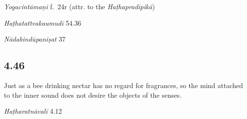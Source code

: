 \begin{ekdosis}

\begin{testimonia}[hp04_045]
\emph{Yogacintāmaṇi} f.~24r (attr. to the \emph{Haṭhapradīpikā})
\begin{versinnote}
\end{versinnote}

\emph{Haṭhatattvakaumudī} 54.36
\begin{versinnote}
\end{versinnote}

\emph{Nādabindūpaniṣat} 37
\begin{versinnote}
\end{versinnote}
\end{testimonia}


\subsection*{4.46}
\begin{translation}[hp04_046]
Just as a bee drinking nectar has no regard for fragrances, so the mind attached to the inner sound does not desire the objects of the senses.
\end{translation}


\begin{testimonia}[hp04_046]
\emph{Haṭharatnāvalī} 4.12
\begin{versinnote}
\end{versinnote}


\end{testimonia}
\end{ekdosis}
